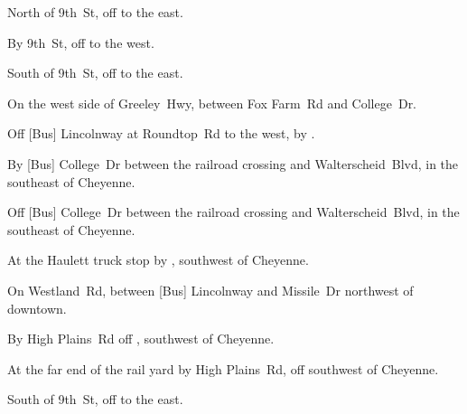 
\begin{LocationList}

North of 9th~St, off   to the east.

By 9th~St, off   to the west.

South of 9th~St, off   to the east.

On the west side of  Greeley~Hwy, between Fox Farm~Rd and College~Dr.

Off [Bus] Lincolnway at  Roundtop~Rd to the west, by  .

By [Bus]  College~Dr between the railroad crossing and Walterscheid~Blvd, in the southeast of Cheyenne.

Off [Bus]  College~Dr between the railroad crossing and Walterscheid~Blvd, in the southeast of Cheyenne.

At the Haulett truck stop by  , southwest of Cheyenne.

On Westland~Rd, between [Bus] Lincolnway and Missile~Dr northwest of downtown.

By High Plains~Rd off  , southwest of Cheyenne.

At the far end of the rail yard by High Plains~Rd, off   southwest of Cheyenne.

South of 9th~St, off   to the east.

\end{LocationList}
